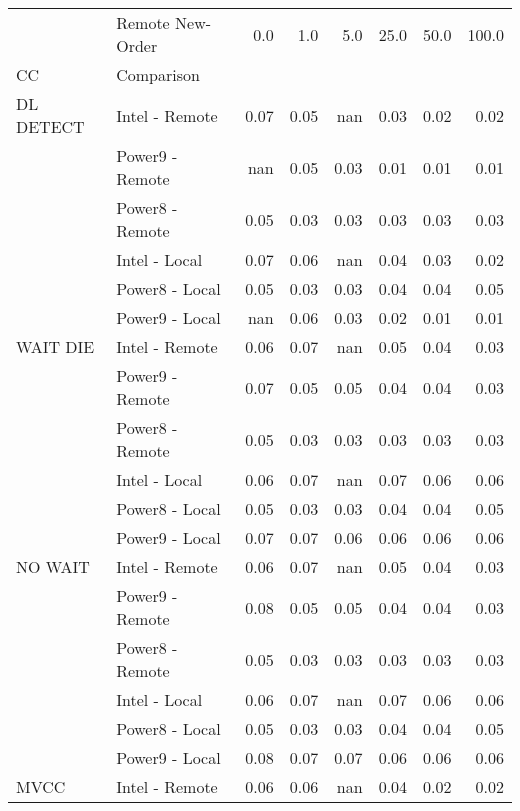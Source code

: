 \begin{tabular}{llrrrrrr}
\toprule
       & Remote New-Order &  0.0   &  1.0   &  5.0   &  25.0  &  50.0  &  100.0 \\
CC & Comparison &        &        &        &        &        &        \\
\midrule
DL DETECT & Intel - Remote &   0.07 &   0.05 &    nan &   0.03 &   0.02 &   0.02 \\
       & Power9 - Remote &    nan &   0.05 &   0.03 &   0.01 &   0.01 &   0.01 \\
       & Power8 - Remote &   0.05 &   0.03 &   0.03 &   0.03 &   0.03 &   0.03 \\
       & Intel - Local &   0.07 &   0.06 &    nan &   0.04 &   0.03 &   0.02 \\
       & Power8 - Local &   0.05 &   0.03 &   0.03 &   0.04 &   0.04 &   0.05 \\
       & Power9 - Local &    nan &   0.06 &   0.03 &   0.02 &   0.01 &   0.01 \\
WAIT DIE & Intel - Remote &   0.06 &   0.07 &    nan &   0.05 &   0.04 &   0.03 \\
       & Power9 - Remote &   0.07 &   0.05 &   0.05 &   0.04 &   0.04 &   0.03 \\
       & Power8 - Remote &   0.05 &   0.03 &   0.03 &   0.03 &   0.03 &   0.03 \\
       & Intel - Local &   0.06 &   0.07 &    nan &   0.07 &   0.06 &   0.06 \\
       & Power8 - Local &   0.05 &   0.03 &   0.03 &   0.04 &   0.04 &   0.05 \\
       & Power9 - Local &   0.07 &   0.07 &   0.06 &   0.06 &   0.06 &   0.06 \\
NO WAIT & Intel - Remote &   0.06 &   0.07 &    nan &   0.05 &   0.04 &   0.03 \\
       & Power9 - Remote &   0.08 &   0.05 &   0.05 &   0.04 &   0.04 &   0.03 \\
       & Power8 - Remote &   0.05 &   0.03 &   0.03 &   0.03 &   0.03 &   0.03 \\
       & Intel - Local &   0.06 &   0.07 &    nan &   0.07 &   0.06 &   0.06 \\
       & Power8 - Local &   0.05 &   0.03 &   0.03 &   0.04 &   0.04 &   0.05 \\
       & Power9 - Local &   0.08 &   0.07 &   0.07 &   0.06 &   0.06 &   0.06 \\
MVCC & Intel - Remote &   0.06 &   0.06 &    nan &   0.04 &   0.02 &   0.02 \\

\end{tabular}
